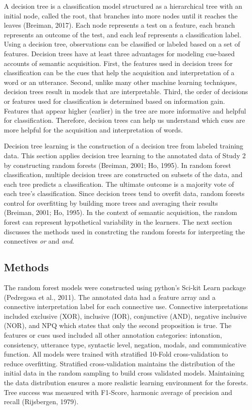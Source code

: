 \documentclass[,man,floatsintext]{apa6}
\begin{document}
A decision tree is a classification model structured as a hierarchical tree with an initial node, called the root, that branches into more nodes until it reaches the leaves (Breiman, 2017). Each node represents a test on a feature, each branch represents an outcome of the test, and each leaf represents a classification label. Using a decision tree, observations can be classified or labeled based on a set of features. Decision trees have at least three advantages for modeling cue-based accounts of semantic acquisition. First, the features used in decision trees for classification can be the cues that help the acquisition and interpretation of a word or an utterance. Second, unlike many other machine learning techniques, decision trees result in models that are interpretable. Third, the order of decisions or features used for classification is determined based on information gain. Features that appear higher (earlier) in the tree are more informative and helpful for classification. Therefore, decision trees can help us understand which cues are more helpful for the acquisition and interpretation of words.

Decision tree learning is the construction of a decision tree from labeled training data. This section applies decision tree learning to the annotated data of Study 2 by constructing random forests (Breiman, 2001; Ho, 1995). In random forest classification, multiple decision trees are constructed on subsets of the data, and each tree predicts a classification. The ultimate outcome is a majority vote of each tree's classification. Since decision trees tend to overfit data, random forests control for overfitting by building more trees and averaging their results (Breiman, 2001; Ho, 1995). In the context of semantic acquisition, the random forest can represent hypothetical variability in the learners. The next section discusses the methods used in constrcting the random forests for interpreting the connectives \emph{or} and \emph{and}.

\hypertarget{methods-2}{%
\subsection{Methods}\label{methods-2}}

The random forest models were constructed using python's Sci-kit Learn package (Pedregosa et al., 2011). The annotated data had a feature array and a connective interpretation label for each connective use. Connective interpretations included exclusive (XOR), inclusive (IOR), conjunctive (AND), negative inclusive (NOR), and NPQ which states that only the second proposition is true. The features or cues used included all other annotation categories: intonation, consistency, utterance type, syntactic level, negation, modals, and communicative function. All models were trained with stratified 10-Fold cross-validation to reduce overfitting. Stratified cross-validation maintains the distribution of the initial data in the random sampling to build cross validated models. Maintaining the data distribution ensures a more realistic learning environment for the forests. Tree success was measured with F1-Score, harmonic average of precision and recall (Rijsbergen, 1979).
\end{document}
